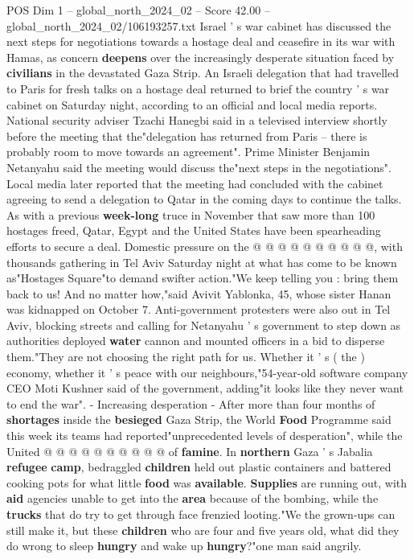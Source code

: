 \begin{textsample}{POS Dim 1 – global\_north\_2024\_02 – Score 42.00 – global\_north\_2024\_02/106193257.txt}  \label{ex:f1_pos_098}
Israel ' s war cabinet has discussed the next steps for negotiations towards a hostage deal and ceasefire in its war with Hamas, as concern \textbf{deepens} over the increasingly desperate situation faced by \textbf{civilians} in the devastated Gaza Strip.
An Israeli delegation that had travelled to Paris for fresh talks on a hostage deal returned to brief the country ' s war cabinet on Saturday night, according to an official and local media reports.
National security adviser Tzachi Hanegbi said in a televised interview shortly before the meeting that the"delegation has returned from Paris -- there is probably room to move towards an agreement".
Prime Minister Benjamin Netanyahu said the meeting would discuss the"next steps in the negotiations".
Local media later reported that the meeting had concluded with the cabinet agreeing to send a delegation to Qatar in the coming days to continue the talks.
As with a previous \textbf{week-long} truce in November that saw more than 100 hostages freed, Qatar, Egypt and the United States have been spearheading efforts to secure a deal.
Domestic pressure on the @ @ @ @ @ @ @ @ @ @, with thousands gathering in Tel Aviv Saturday night at what has come to be known as"Hostages Square"to demand swifter action."We keep telling you : bring them back to us!
And no matter how,"said Avivit Yablonka, 45, whose sister Hanan was kidnapped on October 7.
Anti-government protesters were also out in Tel Aviv, blocking streets and calling for Netanyahu ' s government to step down as authorities deployed \textbf{water} cannon and mounted officers in a bid to disperse them."They are not choosing the right path for us.
Whether it ' s ( the ) economy, whether it ' s peace with our neighbours,"54-year-old software company CEO Moti Kushner said of the government, adding"it looks like they never want to end the war". - Increasing desperation - After more than four months of \textbf{shortages} inside the \textbf{besieged} Gaza Strip, the World \textbf{Food} Programme said this week its teams had reported"unprecedented levels of desperation", while the United @ @ @ @ @ @ @ @ @ @ of \textbf{famine}.
In \textbf{northern} Gaza ' s Jabalia \textbf{refugee} \textbf{camp}, bedraggled \textbf{children} held out plastic containers and battered cooking pots for what little \textbf{food} was \textbf{available}. \textbf{Supplies} are running out, with \textbf{aid} agencies unable to get into the \textbf{area} because of the bombing, while the \textbf{trucks} that do try to get through face frenzied looting."We the grown-ups can still make it, but these \textbf{children} who are four and five years old, what did they do wrong to sleep \textbf{hungry} and wake up \textbf{hungry}?"one man said angrily.

\end{textsample}
